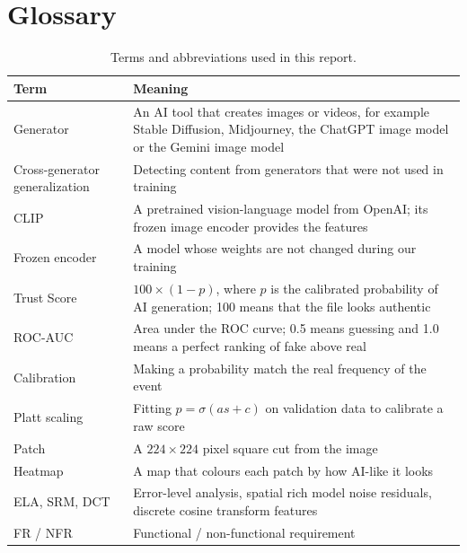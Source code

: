 \chapter{Glossary}
\begin{table}[htbp]
\centering\small
\caption{Terms and abbreviations used in this report.}
\begin{tabularx}{\linewidth}{@{}p{3.6cm}X@{}}
\toprule
Term & Meaning\\
\midrule
Generator & An AI tool that creates images or videos, for example Stable Diffusion, Midjourney, the ChatGPT image model or the Gemini image model\\
Cross-generator generalization & Detecting content from generators that were not used in training\\
CLIP & A pretrained vision-language model from OpenAI; its frozen image encoder provides the features\\
Frozen encoder & A model whose weights are not changed during our training\\
Trust Score & $100\times(1-p)$, where $p$ is the calibrated probability of AI generation; 100 means that the file looks authentic\\
ROC-AUC & Area under the ROC curve; 0.5 means guessing and 1.0 means a perfect ranking of fake above real\\
Calibration & Making a probability match the real frequency of the event\\
Platt scaling & Fitting $p=\sigma(a s+c)$ on validation data to calibrate a raw score\\
Patch & A $224\times224$ pixel square cut from the image\\
Heatmap & A map that colours each patch by how AI-like it looks\\
ELA, SRM, DCT & Error-level analysis, spatial rich model noise residuals, discrete cosine transform features\\
FR / NFR & Functional / non-functional requirement\\
\bottomrule
\end{tabularx}
\end{table}
